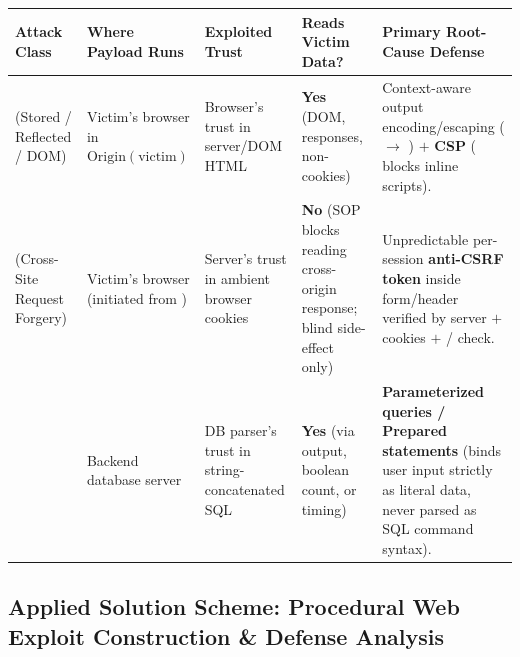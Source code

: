 \begin{table}[h!]
\centering
\footnotesize
\begin{tabularx}{\textwidth}{@{}L{2.6cm} L{2.8cm} L{2.8cm} L{3.0cm} Y@{}}
\toprule
\textbf{Attack Class} & \textbf{Where Payload Runs} & \textbf{Exploited Trust} & \textbf{Reads Victim Data?} & \textbf{Primary Root-Cause Defense} \\
\midrule
{} (Stored / Reflected / DOM) & Victim's browser in $\mathrm{Origin}(\text{victim})$ & Browser's trust in server/DOM HTML & \textbf{Yes} (DOM, responses, non- cookies) & Context-aware output encoding/escaping (\code{<} $\to$ ) $+$ \textbf{CSP} ( blocks inline scripts). \\
 (Cross-Site Request Forgery) & Victim's browser (initiated from ) & Server's trust in ambient browser cookies & \textbf{No} (SOP blocks reading cross-origin response; blind side-effect only) & Unpredictable per-session \textbf{anti-CSRF token} inside form/header verified by server $+$  cookies $+$ / check. \\
 & Backend database server & DB parser's trust in string-concatenated SQL & \textbf{Yes} (via output, boolean count, or  timing) & \textbf{Parameterized queries / Prepared statements} (binds user input strictly as literal data, never parsed as SQL command syntax). \\
\bottomrule
\end{tabularx}
\end{table}

\subsection{Applied Solution Scheme: Procedural Web Exploit Construction \& Defense Analysis}

